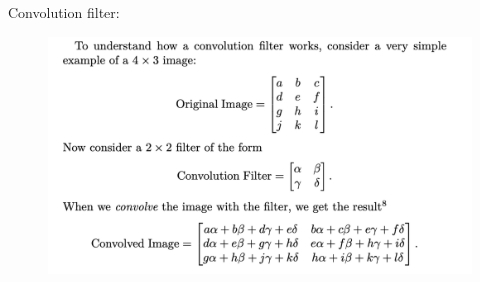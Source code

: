 \documentclass{article}
\begin{document}
Convolution filter:\\

\begin{figure}[h!]
    \centering
    \includegraphics[width=0.75\linewidth]{Convolution.png}
\end{figure}
\end{document}
